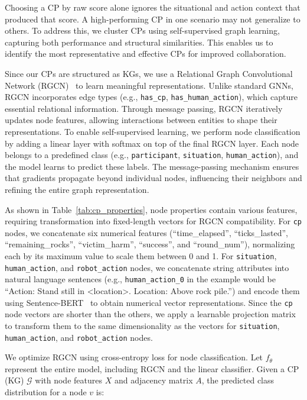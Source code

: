 \documentclass[letterpaper]{article} %
\begin{document}
Choosing a CP by raw score alone ignores the situational and action context that produced that score. A high-performing CP in one scenario may not generalize to others. To address this, we cluster CPs using self-supervised graph learning, capturing both performance and structural similarities. This enables us to identify the most representative and effective CPs for improved collaboration. 

Since our CPs are structured as KGs, we use a Relational Graph Convolutional Network (RGCN)~\cite{schlichtkrull2017modelingrelationaldatagraph} to learn meaningful representations. Unlike standard GNNs, RGCN incorporates edge types (e.g., \texttt{has\_cp}, \texttt{has\_human\_action}), which capture essential relational information. Through message passing, RGCN iteratively updates node features, allowing interactions between entities to shape their representations. To enable self-supervised learning, we perform node classification by adding a linear layer with softmax on top of the final RGCN layer. Each node belongs to a predefined class (e.g., \texttt{participant}, \texttt{situation}, \texttt{human\_action}), and the model learns to predict these labels. The message-passing mechanism ensures that gradients propagate beyond individual nodes, influencing their neighbors and refining the entire graph representation.

As shown in Table~\ref{tab:cp_properties}, node properties contain various features, requiring transformation into fixed-length vectors for RGCN compatibility. For \texttt{cp} nodes, we concatenate six numerical features (``time\_elapsed'', ``ticks\_lasted'', ``remaining\_rocks'', ``victim\_harm'', ``success'', and ``round\_num''), normalizing each by its maximum value to scale them between 0 and 1. For \texttt{situation}, \texttt{human\_action}, and \texttt{robot\_action} nodes, we concatenate string attributes into natural language sentences (e.g., \texttt{human\_action\_0} in the example would be ``Action: Stand still in \textless location\textgreater. Location: Above rock pile.'') and encode them using Sentence-BERT~\cite{reimers2019sentencebertsentenceembeddingsusing} to obtain numerical vector representations. Since the \texttt{cp} node vectors are shorter than the others, we apply a learnable projection matrix to transform them to the same dimensionality as the vectors for \texttt{situation}, \texttt{human\_action}, and \texttt{robot\_action} nodes.

We optimize RGCN using cross-entropy loss for node classification. Let \( f_{\theta} \) represent the entire model, including RGCN and the linear classifier. Given a CP (KG) \( \mathcal{G} \) with node features \( X \) and adjacency matrix \( A \), the predicted class distribution for a node \( v \) is:
\end{document}
